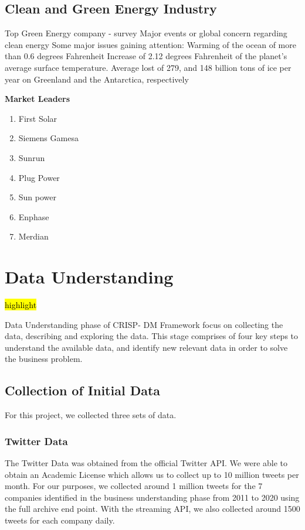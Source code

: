 \documentclass[sigconf, nonacm]{acmart}
\begin{document}
\subsection{Clean and Green Energy Industry }
Top Green Energy company - survey
Major events or global concern regarding clean energy
Some major issues gaining attention:
Warming of the ocean of more than 0.6 degrees Fahrenheit
Increase of 2.12 degrees Fahrenheit of the planet’s average surface temperature.
Average lost of 279, and 148 billion tons of ice per year on Greenland and the Antarctica, respectively

\textbf{Market Leaders }
\begin{enumerate}
    \item First Solar
    \item Siemens Gamesa
    \item Sunrun
    \item Plug Power
    \item Sun power 
    \item Enphase 
    \item Merdian 
\end{enumerate}





\section{Data Understanding}
\hl{highlight}

Data Understanding phase of CRISP- DM Framework focus on collecting the data, describing and exploring the data.
This stage comprises of four key steps to understand the available data, and identify new relevant data in order to solve the business problem. 




\subsection{Collection of Initial Data} %
For this project, we collected three sets of data.

\subsubsection{Twitter Data}
The Twitter Data was obtained from the official Twitter API. We were able to obtain an Academic License which allows us to collect up to 10 million tweets per month. For our purposes, we collected around 1 million tweets for the 7 companies identified in the business understanding phase from 2011 to 2020 using the full archive end point. With the streaming API, we also collected around 1500 tweets for each company daily.
\end{document}
